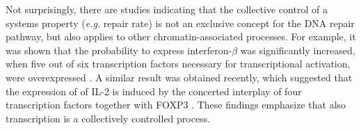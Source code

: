 Not surprisingly, there are studies indicating that the collective control of a systems property (\textit{e.g.} repair rate) is not an exclusive concept for the DNA repair pathway, but also applies to other chromatin-associated processes. For example, it was shown that the probability to express interferon-$\beta$ was significantly increased, when five out of six transcription factors necessary for transcriptional activation, were overexpressed \cite{Apostolou2008}. A similar result was obtained recently, which suggested that the expression of of IL-2 is induced by the concerted interplay of four transcription factors together with FOXP3 \cite{Bendfeldt2012}. These findings emphasize that also transcription is a collectively controlled process.   

%
%

